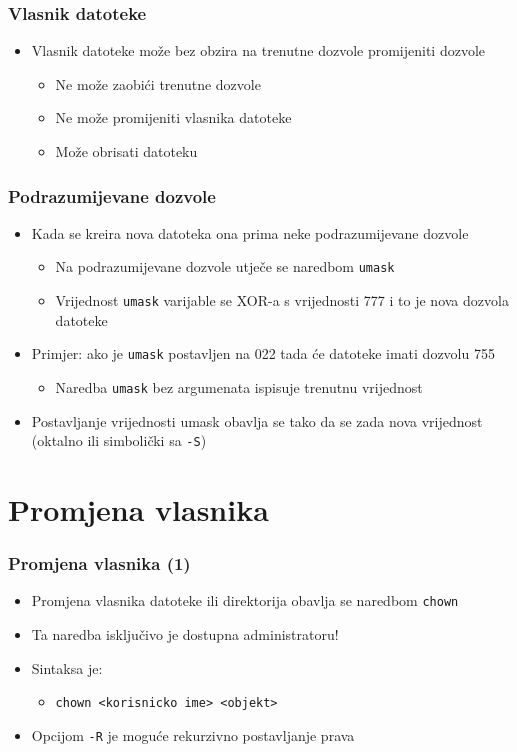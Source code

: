 \documentclass[table,usenames,dvipsnames]{beamer}
\newcommand{\shell}[1]{\texttt{#1}}
\begin{document}
\begin{frame}[t]
\frametitle{Vlasnik datoteke}
\begin{itemize}
  \item Vlasnik datoteke može bez obzira na trenutne dozvole promijeniti 
        dozvole
  \begin{itemize}
    \item Ne može zaobići trenutne dozvole
    \item Ne može promijeniti vlasnika datoteke
    \item Može obrisati datoteku
  \end{itemize}
\end{itemize}
\end{frame}

\begin{frame}[t]
\frametitle{Podrazumijevane dozvole}
\begin{itemize}
  \item Kada se kreira nova datoteka ona prima neke podrazumijevane dozvole
  \begin{itemize}
    \item Na podrazumijevane dozvole utječe se naredbom \shell{umask}
    \item Vrijednost \shell{umask} varijable se XOR-a s vrijednosti 777 i 
          to je nova dozvola datoteke
  \end{itemize}
  \item Primjer: ako je \shell{umask} postavljen na 022 tada će datoteke 
        imati dozvolu 755
  \begin{itemize}
    \item Naredba \shell{umask} bez argumenata ispisuje trenutnu vrijednost
  \end{itemize}
  \item Postavljanje vrijednosti umask obavlja se tako da se zada nova 
        vrijednost (oktalno ili simbolički sa \shell{-S})
\end{itemize}
\end{frame}
  
\section{Promjena vlasnika}
\begin{frame}[t]
\frametitle{Promjena vlasnika (1)}
\begin{itemize}
  \item Promjena vlasnika datoteke ili direktorija obavlja se naredbom 
        \shell{chown}
  \item Ta naredba isključivo je dostupna administratoru!
  \item Sintaksa je:
  \begin{itemize}
    \item[] \shell{chown <korisnicko ime> <objekt>}
  \end{itemize}
  \item Opcijom \shell{-R} je moguće rekurzivno postavljanje prava
\end{itemize}
\end{frame}
\end{document}
